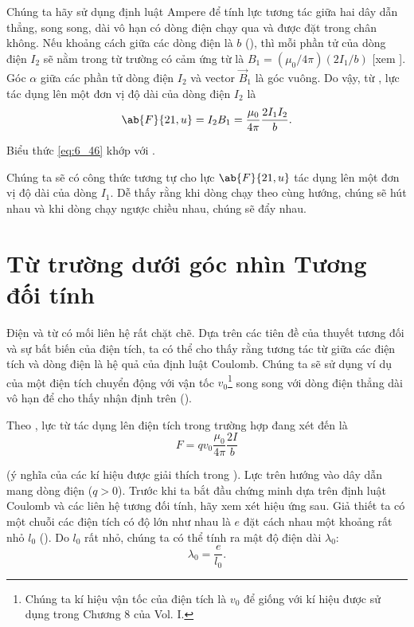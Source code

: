 Chúng ta hãy sử dụng định luật Ampere để tính lực tương tác giữa hai dây dẫn thẳng, song song, dài vô hạn có dòng điện chạy qua và được đặt trong chân không. Nếu khoảng cách giữa các dòng điện là $b$ (), thì mỗi phần tử của dòng điện $I_2$ sẽ nằm trong từ trường có cảm ứng từ là $B_1=(\mu_0/4\pi)(2I_1/b)$ [xem ]. Góc $\alpha$ giữa các phần tử dòng điện $I_2$ và vector $\vec{B}_1$ là góc vuông. Do vậy, từ , lực tác dụng lên một đơn vị độ dài của dòng điện $I_2$ là
\begin{equation}\label{eq:6_46}
    \ab{F}{21,u} = I_2 B_1 = \frac{\mu_0}{4\pi} \frac{2 I_1 I_2}{b}.
\end{equation}

\noindent
Biểu thức \eqref{eq:6_46} khớp với .

Chúng ta sẽ có công thức tương tự cho lực $\ab{F}{21,u}$ tác dụng lên một đơn vị độ dài của dòng $I_1$. Dễ thấy rằng khi dòng chạy theo cùng hướng, chúng sẽ hút nhau và khi dòng chạy ngược chiều nhau, chúng sẽ đẩy nhau.

\section{Từ trường dưới góc nhìn Tương đối tính}\label{sec:6_7}

Điện và từ có mối liên hệ rất chặt chẽ. Dựa trên các tiên đề của thuyết tương đối và sự bất biến của điện tích, ta có thể cho thấy rằng tương tác từ giữa các điện tích và dòng điện là hệ quả của định luật Coulomb. Chúng ta sẽ sử dụng ví dụ của một điện tích chuyển động với vận tốc $v_0$\footnote{Chúng ta kí hiệu vận tốc của điện tích là $v_0$ để giống với kí hiệu được sử dụng trong Chương 8 của Vol. I.} song song với dòng điện thẳng dài vô hạn để cho thấy nhận định trên ().

Theo , lực từ tác dụng lên điện tích trong trường hợp đang xét đến là
\begin{equation}\label{eq:6_47}
    F = q v_0 \frac{\mu_0}{4\pi} \frac{2 I}{b}
\end{equation}

\noindent
(ý nghĩa của các kí hiệu được giải thích trong ). Lực trên hướng vào dây dẫn mang dòng điện ($q>0$). Trước khi ta bắt đầu chứng minh  dựa trên định luật Coulomb và các liên hệ tương đối tính, hãy xem xét hiệu ứng sau. Giả thiết ta có một chuỗi các điện tích có độ lớn như nhau là $e$ đặt cách nhau một khoảng rất nhỏ $l_0$ (). Do $l_0$ rất nhỏ, chúng ta có thể tính ra mật độ điện dài $\lambda_0$:
\begin{equation}\label{eq:6_48}
    \lambda_0 = \frac{e}{l_0}.
\end{equation}

